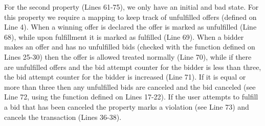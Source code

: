 \documentclass{article}
\begin{document}
For the second property (Lines 61-75), we only have an initial and bad state. For this property we require a mapping to keep track of unfulfilled offers (defined on Line 4). When a winning offer is declared the offer is marked as unfulfilled (Line 68), while upon fulfillment it is marked as fulfilled (Line 69). When a bidder makes an offer and has no unfulfilled bids (checked with the function defined on Lines 25-30) then the offer is allowed treated normally (Line 70), while if there are unfulfilled offers and the bid attempt counter for the bidder is less than three, the bid attempt counter for the bidder is increased (Line 71). If it is equal or more than three then any unfulfilled bids are canceled and the bid canceled (see Line 72, using the function defined on Lines 17-22). If the user attempts to fulfill a bid that has been canceled the property marks a violation (see Line 73) and cancels the transaction (Lines 36-38).
 
\end{document}
